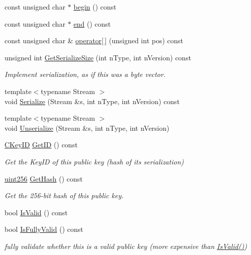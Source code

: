 \begin{DoxyCompactItemize}
const unsigned char $\ast$ \hyperlink{class_c_pub_key_add9987e0d25aff11181f5ad70413994b}{begin} () const 
\item 
const unsigned char $\ast$ \hyperlink{class_c_pub_key_aa559d2a4f2cbdec84c02a4adc18fa657}{end} () const 
\item 
const unsigned char \& \hyperlink{class_c_pub_key_a70df86158a27670eb4566ca0c587cdec}{operator\mbox{[}$\,$\mbox{]}} (unsigned int pos) const 
\item 
unsigned int \hyperlink{class_c_pub_key_a71ca590df9b99faaf1604f826d2c8807}{Get\+Serialize\+Size} (int n\+Type, int n\+Version) const 
\begin{DoxyCompactList}\small\item\em Implement serialization, as if this was a byte vector. \end{DoxyCompactList}\item 
{\footnotesize template$<$typename Stream $>$ }\\void \hyperlink{class_c_pub_key_a315865ee4c45726c01fae44d53b180a1}{Serialize} (Stream \&s, int n\+Type, int n\+Version) const 
\item 
{\footnotesize template$<$typename Stream $>$ }\\void \hyperlink{class_c_pub_key_a1cfd8e3c711f5298eecdacd5979f6e6c}{Unserialize} (Stream \&s, int n\+Type, int n\+Version)
\item 
\hyperlink{class_c_key_i_d}{C\+Key\+I\+D} \hyperlink{class_c_pub_key_a9c1908fef34fd9e1c4b5e0ffd5d3834e}{Get\+I\+D} () const 
\begin{DoxyCompactList}\small\item\em Get the Key\+I\+D of this public key (hash of its serialization) \end{DoxyCompactList}\item 
\hyperlink{classuint256}{uint256} \hyperlink{class_c_pub_key_a85b5eaf92b26cb4a230586050285c3f4}{Get\+Hash} () const 
\begin{DoxyCompactList}\small\item\em Get the 256-\/bit hash of this public key. \end{DoxyCompactList}\item 
bool \hyperlink{class_c_pub_key_aad6f369d7972f2244466ca6db900c2a4}{Is\+Valid} () const 
\item 
bool \hyperlink{class_c_pub_key_a2533ec5fc9a1c3d2ef39d0faa3ad6cdd}{Is\+Fully\+Valid} () const 
\begin{DoxyCompactList}\small\item\em fully validate whether this is a valid public key (more expensive than \hyperlink{class_c_pub_key_aad6f369d7972f2244466ca6db900c2a4}{Is\+Valid()}) \end{DoxyCompactList}\item 

\end{DoxyCompactItemize}

